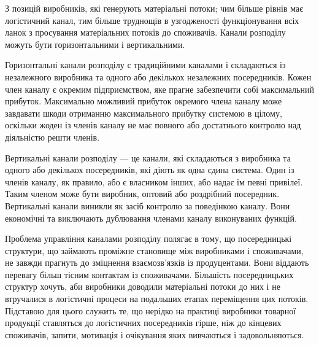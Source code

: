З позицій виробників, які генерують матеріальні потоки; чим більше рівнів має логістичний канал, тим більше труднощів в узгодженості функціонування всіх ланок з просування матеріальних потоків до споживачів.
Канали розподілу можуть бути горизонтальними і вертикальними.

Горизонтальні канали розподілу є традиційними каналами і складаються із незалежного виробника та одного або декількох незалежних посередників. 
Кожен член каналу є окремим підприємством, яке прагне забезпечити собі максимальний прибуток. 
Максимально можливий прибуток окремого члена каналу може завдавати шкоди отриманню максимального прибутку системою в цілому, оскільки жоден із членів каналу не має повного або достатнього контролю над діяльністю решти членів.

Вертикальні канали розподілу --- це канали, які складаються з виробника та одного або декількох посередників, які діють як одна єдина система. 
Один із членів каналу, як правило, або є власником інших, або надає їм певні привілеї. 
Таким членом може бути виробник, оптовий або роздрібний посередник. 
Вертикальні канали виникли як засіб контролю за поведінкою каналу. 
Вони економічні та виключають дублювання членами каналу виконуваних функцій.

Проблема управління каналами розподілу полягає в тому, що посередницькі структури, що займають проміжне становище між виробниками і споживачами, не завжди прагнуть до зміцнення взаємозв'язків із продуцентами. 
Вони віддають перевагу більш тісним контактам із споживачами. 
Більшість посередницьких структур хочуть, аби виробники доводили матеріальні потоки до них і не втручалися в логістичні процеси на подальших етапах переміщення цих потоків. 
Підставою для цього служить те, що нерідко на практиці виробники товарної продукції ставляться до логістичних посередників гірше, ніж до кінцевих споживачів, запити, мотивація і очікування яких вивчаються і задовольняються. 

